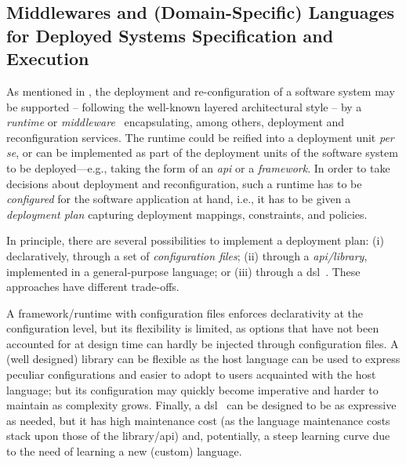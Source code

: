 \documentclass[conference]{IEEEtran}
\begin{document}
\subsection{Middlewares and (Domain-Specific) Languages for Deployed Systems Specification and Execution}

As mentioned in ,
 the deployment and re-configuration of a software system
 may be supported -- following the well-known layered architectural style -- by a \emph{runtime} or \emph{middleware}~\cite{DBLP:journals/cacm/GazisK22}
 encapsulating, among others, deployment and reconfiguration services.
%
The runtime could be reified into a deployment unit \emph{per se},
 or can be implemented as part of the deployment units of the software system to be deployed---e.g., taking the form of an \emph{\ac{api}} or a \emph{framework}.
%
In order to take decisions about deployment and reconfiguration, 
 such a runtime has to be \emph{configured}
 for the software application at hand,
 i.e., it has to be given a \emph{deployment plan} capturing deployment mappings, constraints, and policies.
%

In principle, there are several possibilities to implement a deployment plan:
%
(i) declaratively, through a set of \emph{configuration files};
(ii) through a \emph{\ac{api}/library}, implemented in a general-purpose language;
or 
(iii) through a \ac{dsl}~\cite{dsl-book-voelter}. %
%
These approaches have different trade-offs.

A framework/runtime with configuration files enforces declarativity at the configuration level,
but its flexibility is limited,
as options that have not been accounted for at design time can hardly be injected through configuration files.
%
A (well designed) library can be flexible as the host language can be used to express peculiar configurations
and easier to adopt to users acquainted with the host language;
but its configuration may quickly become imperative and harder to maintain as complexity grows.
%
Finally, a \ac{dsl}~\cite{dsl-book-voelter} can be designed to be as expressive as needed,
but it has high maintenance cost (as the language maintenance costs stack upon those of the library/\ac{api}) and, potentially,
a steep learning curve due to the need of learning a new (custom) language.
\end{document}
